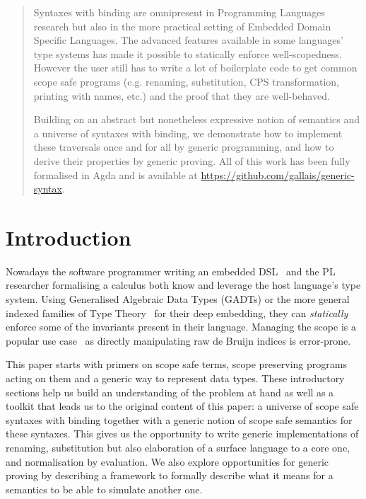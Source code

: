 \begin{abstract}
Syntaxes with binding are omnipresent in Programming Languages
research but also in the more practical setting of Embedded
Domain Specific Languages. The advanced features available in
some languages' type systems has made it possible to statically
enforce well-scopedness. However the user still has to write a
lot of boilerplate code to get common scope safe programs (e.g.
renaming, substitution, CPS transformation, printing with names,
etc.) and the proof that they are well-behaved.

Building on an abstract but nonetheless expressive notion of
semantics and a universe of syntaxes with binding, we demonstrate
how to implement these traversals once and for all by generic
programming, and how to derive their properties by generic proving.
All of this work has been fully formalised in Agda and is available
at \url{https://github.com/gallais/generic-syntax}.
\end{abstract}

\section{Introduction}

Nowadays the software programmer writing an embedded DSL~\cite{hudak1996building}
and the PL researcher formalising a calculus both know and
leverage the host language's type system. Using Generalised
Algebraic Data Types (GADTs) or the more general indexed
families of Type Theory~\cite{dybjer1994inductive} for their deep embedding, they can
\emph{statically} enforce some of the invariants present in
their language. Managing the scope is a popular use case~\cite{altenkirch1999monadic} as
directly manipulating raw de Bruijn indices is error-prone.

This paper starts with primers on scope safe terms, scope preserving
programs acting on them and a generic way to represent data types.
These introductory sections help us build an understanding of the
problem at hand as well as a toolkit that leads us to the original
content of this paper: a universe of scope safe syntaxes with binding
together with a generic notion of scope safe semantics for these syntaxes.
This gives us the opportunity to write generic implementations of renaming,
substitution but also elaboration of a surface language to a core one,
and normalisation by evaluation. We also explore opportunities for
generic proving by describing a framework to formally describe what
it means for a semantics to be able to simulate another one.

